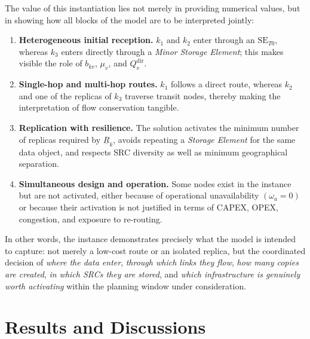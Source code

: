 \documentclass[a4paper,fleqn]{cas-dc}
\begin{document}
The value of this instantiation lies not merely in providing numerical values, but in showing how all blocks of the model are to be interpreted jointly:

\begin{enumerate} 
\item \textbf{Heterogeneous initial reception.} \(k_1\) and \(k_2\) enter through an \(\mathrm{SE}_{T0}\), whereas \(k_3\) enters directly through a \emph{Minor} \emph{Storage Element}; this makes visible the role of \(b_{kv}\), \(\mu_v\), and \(Q_v^{\mathrm{dir}}\). 

\item \textbf{Single-hop and multi-hop routes.} \(k_1\) follows a direct route, whereas \(k_2\) and one of the replicas of \(k_3\) traverse transit nodes, thereby making the interpretation of flow conservation tangible. 

\item \textbf{Replication with resilience.} The solution activates the minimum number of replicas required by \(\underline R_k\), avoids repeating a \emph{Storage Element} for the same data object, and respects SRC diversity as well as minimum geographical separation. 

\item \textbf{Simultaneous design and operation.} Some nodes exist in the instance but are not activated, either because of operational unavailability  \((\omega_a=0)\) or because their activation is not justified in terms of CAPEX, OPEX, congestion, and exposure to re-routing. 

\end{enumerate}


In other words, the instance demonstrates precisely what the model is intended to capture: not merely a low-cost route or an isolated replica, but the coordinated decision of \emph{where the data enter}, \emph{through which links they flow}, \emph{how many copies are created}, \emph{in which SRCs they are stored}, and \emph{which infrastructure is genuinely worth activating} within the planning window under consideration.






\section{Results and Discussions}
\label{Discussions}

\end{document}
